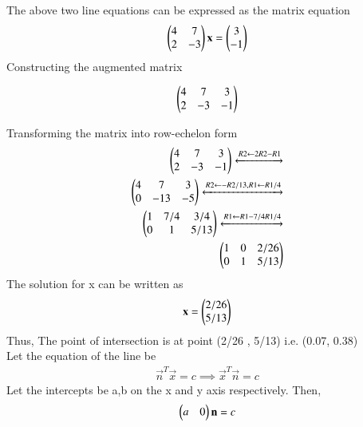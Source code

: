 The above two line equations can be expressed as the matrix equation
    \begin{align}
    \begin{pmatrix}4 & 7\\2 & -3 \end{pmatrix}{\mathbf{x}} = \begin{pmatrix}3\\-1 \end{pmatrix}
    \end{align}
    Constructing the augmented matrix

    \begin{align}
    \begin{pmatrix}4 & 7 & 3 \\ 
        2 & -3 & -1 \end{pmatrix}
    \end{align}

    Transforming the matrix into row-echelon form
    \begin{align}
    \begin{pmatrix}
    4 & 7 & 3 \\
    2 & -3 & -1
    \end{pmatrix}
      \xleftrightarrow[]{R2 \leftarrow 2R2 - R1 } \nonumber \\
    \begin{pmatrix}
    4 & 7 & 3 \\
    0 & -13 & -5
    \end{pmatrix}
    \xleftrightarrow[]{R2 \leftarrow -R2/13,R1 \leftarrow R1/4} \nonumber \\
    \begin{pmatrix}
    1 & 7/4 & 3/4 \\
    0 & 1 & 5/13
    \end{pmatrix}
    \xleftrightarrow[]{R1 \leftarrow R1-7/4R1/4} \nonumber \\
    \begin{pmatrix}
    1 & 0 & 2/26 \\
    0 & 1 & 5/13
    \end{pmatrix}
    \end{align}
    The solution for x can be written as 
    \begin{align}
    \label{expk}
    \mathbf{x} = \begin{pmatrix}2/26 \\ 5/13\end{pmatrix}
    \end{align}
    Thus, The point of intersection is at point (2/26 , 5/13) i.e. (0.07, 0.38)\\
    Let the equation of the line be
    \begin{align}
    \label{equ}
    \vec{n}^T\vec{x} = c \implies \vec{x}^T\vec{n} = c
    \end{align}
    Let the intercepts be a,b on the x and y axis respectively. Then,
    \begin{align} 
    \begin{pmatrix}a & 0\end{pmatrix}\mathbf{n} = c
    \end{align}
   
